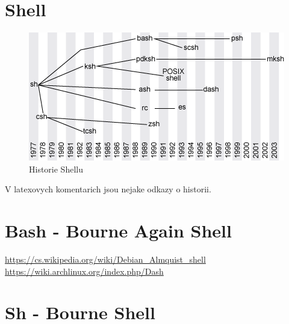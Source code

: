 \documentclass[thesis=M,czech]{FITthesis}[2012/06/26]
\begin{document}


\section{Shell}

\begin{figure}[htb]\centering
	\includegraphics[width=\textwidth]{./images/tmp_shell_history}
	\caption{Historie Shellu}
	\label{fig:shell_history}
\end{figure}

V latexovych komentarich jsou nejake odkazy o historii.







\section{Bash - Bourne Again Shell}

\url{https://cs.wikipedia.org/wiki/Debian_Almquist_shell}
\url{https://wiki.archlinux.org/index.php/Dash}

\section{Sh - Bourne Shell}
\end{document}
